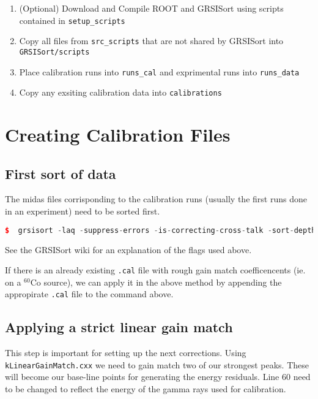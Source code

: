 \documentclass[10pt]{article} %
\begin{document}
\begin{enumerate}
\item
(Optional) Download and Compile ROOT and GRSISort using scripts contained in \texttt{setup\_scripts}

\item
Copy all files from \texttt{src\_scripts} that are not shared by GRSISort into \texttt{GRSISort/scripts}

\item
Place calibration runs into \texttt{runs\_cal} and exprimental runs into \texttt{runs\_data}

\item
Copy any exsiting calibration data into \texttt{calibrations}

\end{enumerate}

\section{Creating Calibration Files}

\subsection{First sort of data}
The midas files corrisponding to the calibration runs (usually the first runs done in an experiment) need to be sorted first.

\begin{lstlisting}[language=c++]
$  grsisort -laq -suppress-errors -is-correcting-cross-talk -sort-depth=70000000 /dir/to/midas/file
\end{lstlisting}

See the GRSISort wiki for an explanation of the flags used above.

If there is an already existing \texttt{.cal} file with rough gain match coefficencents (ie. on a $^{60}$Co source), we can apply it in the above method by appending the appropirate \texttt{.cal} file to the command above.

\subsection{Applying a strict linear gain match}

This step is important for setting up the next corrections.
Using \texttt{kLinearGainMatch.cxx} we need to gain match two of our strongest peaks.
These will become our base-line points for generating the energy residuals.
Line 60 need to be changed to reflect the energy of the gamma rays used for calibration.
\end{document}
